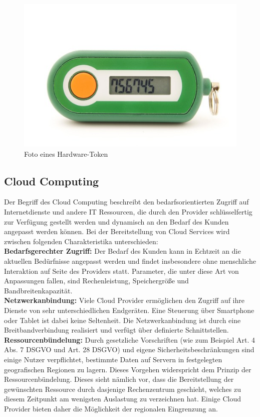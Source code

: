 \documentclass[
book,
a4paper,   
titlepage,  
halfparskip,
12pt        
]{scrartcl}
\begin{document}
\begin{onehalfspacing}
\begin{figure}[h]
	\centering
	\includegraphics[width=0.5\linewidth]{token.jpg}
	\caption[Token]{Foto eines Hardware-Token\cite{token}}
	\label{fig:token}
\end{figure}

\subsection{Cloud Computing}
\label{subsec:cloud}
Der Begriff des Cloud Computing beschreibt den bedarfsorientierten Zugriff auf Internetdienste und andere \ac{IT} Ressourcen, die durch den Provider schlüsselfertig zur Verfügung gestellt werden und dynamisch an den Bedarf des Kunden angepasst werden können. Bei der Bereitstellung von Cloud Services wird zwischen folgenden Charakteristika unterschieden\cite[S. 8]{cloudsec}:\\
\textbf{Bedarfsgerechter Zugriff:} Der Bedarf des Kunden kann in Echtzeit an die aktuellen Bedürfnisse angepasst werden und findet insbesondere ohne menschliche Interaktion auf Seite des Providers statt. Parameter, die unter diese Art von Anpassungen fallen, sind Rechenleistung, Speichergröße und Bandbreitenkapazität.\cite[S. 8]{cloudsec}\\
\textbf{Netzwerkanbindung:}  Viele Cloud Provider ermöglichen den Zugriff auf ihre Dienste von sehr unterschiedlichen Endgeräten. Eine Steuerung über Smartphone oder Tablet ist dabei keine Seltenheit. Die Netzwerkanbindung ist durch eine Breitbandverbindung realisiert und verfügt über definierte Schnittstellen.\cite[S. 8]{cloudsec}\\
\textbf{Ressourcenbündelung:} Durch gesetzliche Vorschriften (wie zum Beispiel Art. 4 Abs. 7 DSGVO und Art. 28 DSGVO\cite{dsgvo}) und eigene Sicherheitsbeschränkungen sind einige Nutzer verpflichtet, bestimmte Daten auf Servern in festgelegten geografischen Regionen zu lagern. Dieses Vorgehen widerspricht dem Prinzip der Ressourcenbündelung. Dieses sieht nämlich vor, dass die Bereitstellung der gewünschten Ressource durch dasjenige Rechenzentrum geschieht, welches zu diesem Zeitpunkt am wenigsten Auslastung zu verzeichnen hat. Einige Cloud Provider bieten daher die Möglichkeit der regionalen Eingrenzung an.\cite[S. 8]{cloudsec}\\

\end{onehalfspacing}
\end{document}
